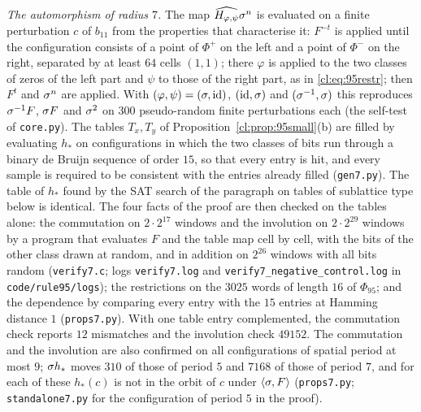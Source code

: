 \emph{The automorphism of radius $7$.} The map $\widehat{H_{\varphi,\psi}}\sigma^n$ is evaluated on a finite perturbation $c$ of $b_{11}$ from the properties that characterise it: $F^{-t}$ is applied until the configuration consists of a point of $\Phi^+$ on the left and a point of $\Phi^-$ on the right, separated by at least $64$ cells $(1,1)$; there $\varphi$ is applied to the two classes of zeros of the left part and $\psi$ to those of the right part, as in \eqref{cl:eq:95restr}; then $F^t$ and $\sigma^n$ are applied. With $(\varphi,\psi)=(\sigma,\mathrm{id})$, $(\mathrm{id},\sigma)$ and $(\sigma^{-1},\sigma)$ this reproduces $\sigma^{-1}F$, $\sigma F$ and $\sigma^2$ on $300$ pseudo-random finite perturbations each (the self-test of \texttt{core.py}). The tables $T_x,T_y$ of Proposition~\ref{cl:prop:95small}(b) are filled by evaluating $h_{\ast}$ on configurations in which the two classes of bits run through a binary de Bruijn sequence of order $15$, so that every entry is hit, and every sample is required to be consistent with the entries already filled (\texttt{gen7.py}). The table of $h_\ast$ found by the SAT search of the paragraph on tables of sublattice type below is identical. The four facts of the proof are then checked on the tables alone: the commutation on $2\cdot2^{17}$ windows and the involution on $2\cdot2^{29}$ windows by a program that evaluates $F$ and the table map cell by cell, with the bits of the other class drawn at random, and in addition on $2^{26}$ windows with all bits random (\texttt{verify7.c}; logs \texttt{verify7.log} and \texttt{verify7\_negative\_control.log} in \texttt{code/rule95/logs}); the restrictions on the $3025$ words of length $16$ of $\Phi_{95}$; and the dependence by comparing every entry with the $15$ entries at Hamming distance $1$ (\texttt{props7.py}). With one table entry complemented, the commutation check reports $12$ mismatches and the involution check $49152$. The commutation and the involution are also confirmed on all configurations of spatial period at most $9$; $\sigma h_{\ast}$ moves $310$ of those of period $5$ and $7168$ of those of period $7$, and for each of these $h_{\ast}(c)$ is not in the orbit of $c$ under $\langle\sigma,F\rangle$ (\texttt{props7.py}; \texttt{standalone7.py} for the configuration of period $5$ in the proof).

